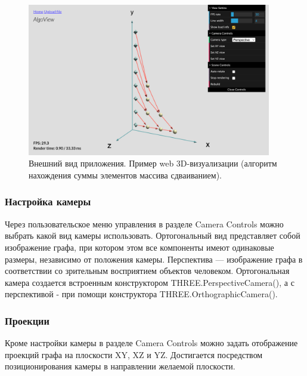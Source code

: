 \begin{figure}[!ht]
    \centering
    \includegraphics[width=0.95\textwidth]{assets/screenshot_1.png}
    \caption{Внешний вид приложения. Пример web 3D-визуализации (алгоритм нахождения суммы элементов массива сдваиванием).}
    \label{fig:screenshot_1}
\end{figure}

\subsubsection{Настройка камеры}

Через пользовательское меню управления в разделе Camera Controls можно выбрать какой вид камеры использовать. Ортогональный вид представляет собой изображение графа, при котором этом все компоненты имеют одинаковые размеры, независимо от положения камеры. Перспектива — изображение графа в соответствии со зрительным восприятием объектов человеком. Ортогональная камера создается встроенным конструктором THREE.PerspectiveCamera(), а с перспективой - при помощи конструктора THREE.OrthographicCamera().

\subsubsection{Проекции}

Кроме настройки камеры в разделе Camera Controls можно задать отображение проекций графа на плоскости XY, XZ и YZ. Достигается посредством позиционирования камеры в направлении желаемой плоскости.

